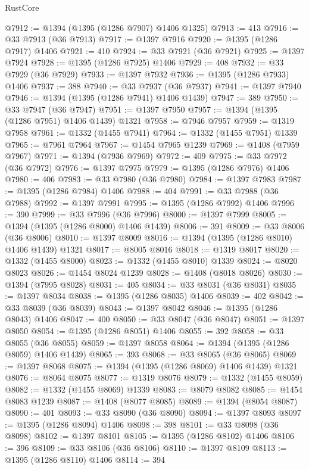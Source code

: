 \begin{lexlean}{RustCore}
\begin{coremodule}
@7912 := @1394 (@1395 (@1286 @7907) @1406 @1325)
@7913 := 413
@7916 := @33 @7913 (@36 @7913)
@7917 := @1397 @7916
@7920 := @1395 (@1286 @7917) @1406
@7921 := 410
@7924 := @33 @7921 (@36 @7921)
@7925 := @1397 @7924
@7928 := @1395 (@1286 @7925) @1406
@7929 := 408
@7932 := @33 @7929 (@36 @7929)
@7933 := @1397 @7932
@7936 := @1395 (@1286 @7933) @1406
@7937 := 388
@7940 := @33 @7937 (@36 @7937)
@7941 := @1397 @7940
@7946 := @1394 (@1395 (@1286 @7941) @1406 @1439)
@7947 := 389
@7950 := @33 @7947 (@36 @7947)
@7951 := @1397 @7950
@7957 := @1394 (@1395 (@1286 @7951) @1406 @1439) @1321
@7958 := @7946 @7957
@7959 := @1319 @7958
@7961 := @1332 (@1455 @7941)
@7964 := @1332 (@1455 @7951) @1339
@7965 := @7961 @7964
@7967 := @1454 @7965 @1239
@7969 := @1408 (@7959 @7967)
@7971 := @1394 (@7936 @7969)
@7972 := 409
@7975 := @33 @7972 (@36 @7972)
@7976 := @1397 @7975
@7979 := @1395 (@1286 @7976) @1406
@7980 := 406
@7983 := @33 @7980 (@36 @7980)
@7984 := @1397 @7983
@7987 := @1395 (@1286 @7984) @1406
@7988 := 404
@7991 := @33 @7988 (@36 @7988)
@7992 := @1397 @7991
@7995 := @1395 (@1286 @7992) @1406
@7996 := 390
@7999 := @33 @7996 (@36 @7996)
@8000 := @1397 @7999
@8005 := @1394 (@1395 (@1286 @8000) @1406 @1439)
@8006 := 391
@8009 := @33 @8006 (@36 @8006)
@8010 := @1397 @8009
@8016 := @1394 (@1395 (@1286 @8010) @1406 @1439) @1321
@8017 := @8005 @8016
@8018 := @1319 @8017
@8020 := @1332 (@1455 @8000)
@8023 := @1332 (@1455 @8010) @1339
@8024 := @8020 @8023
@8026 := @1454 @8024 @1239
@8028 := @1408 (@8018 @8026)
@8030 := @1394 (@7995 @8028)
@8031 := 405
@8034 := @33 @8031 (@36 @8031)
@8035 := @1397 @8034
@8038 := @1395 (@1286 @8035) @1406
@8039 := 402
@8042 := @33 @8039 (@36 @8039)
@8043 := @1397 @8042
@8046 := @1395 (@1286 @8043) @1406
@8047 := 400
@8050 := @33 @8047 (@36 @8047)
@8051 := @1397 @8050
@8054 := @1395 (@1286 @8051) @1406
@8055 := 392
@8058 := @33 @8055 (@36 @8055)
@8059 := @1397 @8058
@8064 := @1394 (@1395 (@1286 @8059) @1406 @1439)
@8065 := 393
@8068 := @33 @8065 (@36 @8065)
@8069 := @1397 @8068
@8075 := @1394 (@1395 (@1286 @8069) @1406 @1439) @1321
@8076 := @8064 @8075
@8077 := @1319 @8076
@8079 := @1332 (@1455 @8059)
@8082 := @1332 (@1455 @8069) @1339
@8083 := @8079 @8082
@8085 := @1454 @8083 @1239
@8087 := @1408 (@8077 @8085)
@8089 := @1394 (@8054 @8087)
@8090 := 401
@8093 := @33 @8090 (@36 @8090)
@8094 := @1397 @8093
@8097 := @1395 (@1286 @8094) @1406
@8098 := 398
@8101 := @33 @8098 (@36 @8098)
@8102 := @1397 @8101
@8105 := @1395 (@1286 @8102) @1406
@8106 := 396
@8109 := @33 @8106 (@36 @8106)
@8110 := @1397 @8109
@8113 := @1395 (@1286 @8110) @1406
@8114 := 394

\end{coremodule}
\end{lexlean}
